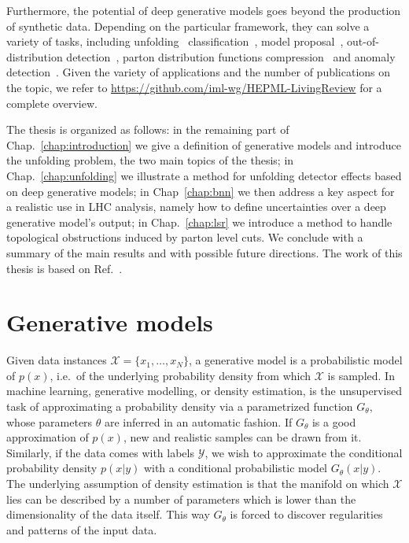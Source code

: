 Furthermore, the potential of deep generative models goes beyond the production of synthetic data. Depending on the particular framework, they can solve a variety of tasks, including unfolding~\cite{Andreassen:2019cjw, Datta:2018mwd,fcgan} classification~\cite{ardizzone2021training, mackowiak2020generative}, model proposal~\cite{2020ganEFT}, out-of-distribution detection~\cite{nalisnick2019deep, kirichenko2020normalizing, serra2020input, song2019unsupervised}, parton distribution functions compression~\cite{compressing_pdf} and anomaly detection~\cite{knapp2020adversarially, pol2020anomaly, cheng2021variational, newPhysAnom}. 
Given the variety of applications and the number of publications on the topic, we refer to \href{https://github.com/iml-wg/HEPML-LivingReview}{https://github.com/iml-wg/HEPML-LivingReview} for a complete overview.

The thesis is organized as follows:
in the remaining part of Chap.~\ref{chap:introduction} we give a definition of generative models and introduce the unfolding problem, the two main topics of the thesis; in Chap.~\ref{chap:unfolding} we illustrate a method for unfolding detector effects based on deep generative models; in Chap~\ref{chap:bnn} we then address a key aspect for a realistic use in LHC analysis, namely how to define uncertainties over a deep generative model's output; in Chap.~\ref{chap:lsr} we introduce a method to handle topological obstructions induced by parton level cuts. We conclude with a summary of the main results and with possible future directions.
The work of this thesis is based on Ref.~\cite{cond_gan, Bellagente:2020piv, Bellagente:2021yyh, LSR}.

\section{Generative models}\label{sec:gmm}
Given data instances $\mathcal{X} = \{ x_1, \ldots , x_N \}$, a generative model is a probabilistic model of $p(x)$, i.e.\ of the underlying probability density from which $\mathcal{X}$ is sampled. 
In machine learning, generative modelling, or density estimation, is the unsupervised task of approximating a probability density via a parametrized function $G_{\theta}$, whose parameters $\theta$ are inferred in an automatic fashion. If $G_{\theta}$ is a good approximation of $p(x)$, new and realistic samples can be drawn from it.
Similarly, if the data comes with labels $\mathcal{Y}$, we wish to approximate the conditional probability density $p(x | y)$ with a conditional probabilistic model $G_{\theta}(x | y)$.
The underlying assumption of density estimation is that the manifold on which $\mathcal{X}$ lies can be described by a number of parameters which is lower than the dimensionality of the data itself. This way $G_{\theta}$ 
is forced to discover regularities and patterns of the input data.

